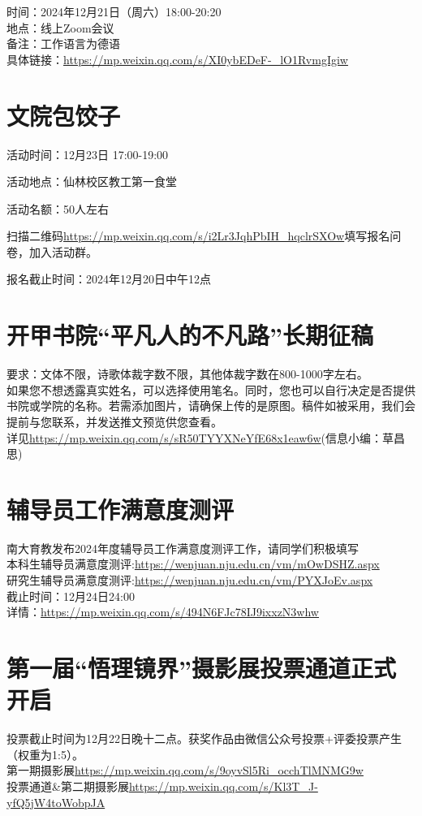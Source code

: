 \documentclass[letterpaper, 12pt]{article}
\begin{document}
\begin{multicols}{2}
时间：2024年12月21日（周六）18:00-20:20\\
地点：线上Zoom会议\\
备注：工作语言为德语\\
具体链接：\url{https://mp.weixin.qq.com/s/XI0ybEDeF-_lO1RvmgIgiw}\\

\section{文院包饺子}
活动时间：12月23日 17:00-19:00

活动地点：仙林校区教工第一食堂

活动名额：50人左右

扫描二维码\url{https://mp.weixin.qq.com/s/i2Lr3JqhPbIH_hqclrSXOw}填写报名问卷，加入活动群。

报名截止时间：2024年12月20日中午12点
\section{开甲书院“平凡人的不凡路”长期征稿}
要求：文体不限，诗歌体裁字数不限，其他体裁字数在800-1000字左右。\\
如果您不想透露真实姓名，可以选择使用笔名。同时，您也可以自行决定是否提供书院或学院的名称。若需添加图片，请确保上传的是原图。稿件如被采用，我们会提前与您联系，并发送推文预览供您查看。\\
详见\url{https://mp.weixin.qq.com/s/sR50TYYXNeYfE68x1eaw6w}(信息小编：草昌思)

\section{辅导员工作满意度测评}
南大育教发布2024年度辅导员工作满意度测评工作，请同学们积极填写\\
本科生辅导员满意度测评:\url{https://wenjuan.nju.edu.cn/vm/mOwDSHZ.aspx}\\
研究生辅导员满意度测评:\url{https://wenjuan.nju.edu.cn/vm/PYXJoEv.aspx}\\
截止时间：12月24日24:00\\
详情：\url{https://mp.weixin.qq.com/s/494N6FJc78IJ9ixxzN3whw}\\



\section{第一届“悟理镜界”摄影展投票通道正式开启}
投票截止时间为12月22日晚十二点。获奖作品由微信公众号投票+评委投票产生（权重为1:5）。\\
第一期摄影展\url{https://mp.weixin.qq.com/s/9oyvSl5Ri_occhTlMNMG9w}\\
投票通道\&第二期摄影展\url{https://mp.weixin.qq.com/s/Kl3T_J-yfQ5jW4toWobpJA}\\


\end{multicols}
\end{document}
